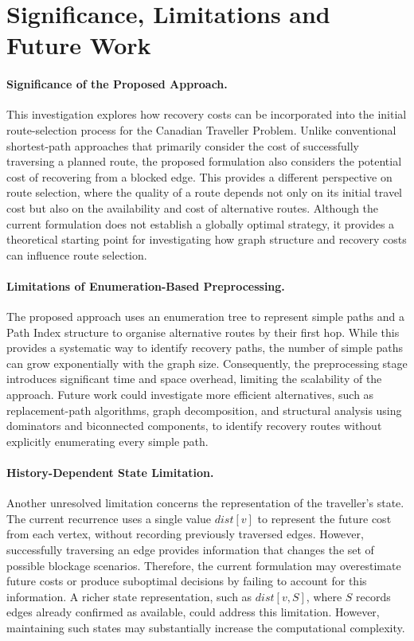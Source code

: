 \documentclass{article}
\begin{document}
\section{Significance, Limitations and Future Work}

\paragraph{Significance of the Proposed Approach.}

This investigation explores how recovery costs can be incorporated into the initial route-selection process for the Canadian Traveller Problem. Unlike conventional shortest-path approaches that primarily consider the cost of successfully traversing a planned route, the proposed formulation also considers the potential cost of recovering from a blocked edge. This provides a different perspective on route selection, where the quality of a route depends not only on its initial travel cost but also on the availability and cost of alternative routes. Although the current formulation does not establish a globally optimal strategy, it provides a theoretical starting point for investigating how graph structure and recovery costs can influence route selection.

\paragraph{Limitations of Enumeration-Based Preprocessing.}

The proposed approach uses an enumeration tree to represent simple paths and a Path Index structure to organise alternative routes by their first hop. While this provides a systematic way to identify recovery paths, the number of simple paths can grow exponentially with the graph size. Consequently, the preprocessing stage introduces significant time and space overhead, limiting the scalability of the approach. Future work could investigate more efficient alternatives, such as replacement-path algorithms, graph decomposition, and structural analysis using dominators and biconnected components, to identify recovery routes without explicitly enumerating every simple path.

\paragraph{History-Dependent State Limitation.}

Another unresolved limitation concerns the representation of the traveller's state. The current recurrence uses a single value $dist[v]$ to represent the future cost from each vertex, without recording previously traversed edges. However, successfully traversing an edge provides information that changes the set of possible blockage scenarios. Therefore, the current formulation may overestimate future costs or produce suboptimal decisions by failing to account for this information. A richer state representation, such as $dist[v,S]$, where $S$ records edges already confirmed as available, could address this limitation. However, maintaining such states may substantially increase the computational complexity.
\end{document}
